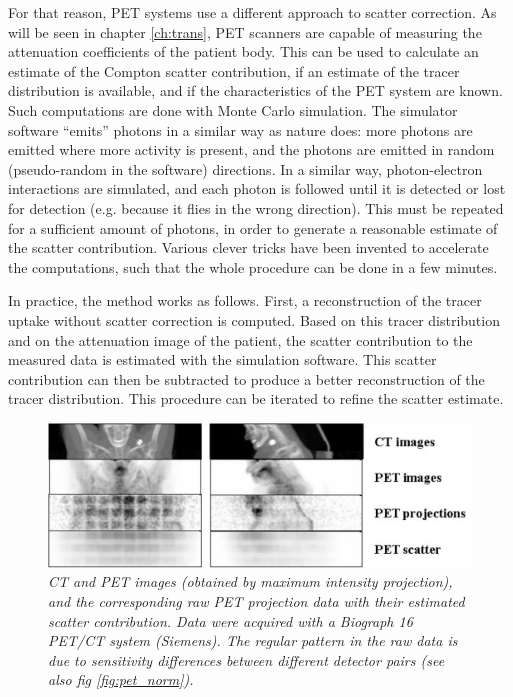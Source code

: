 For that reason, PET systems use a different approach to scatter
correction. As will be seen in chapter \ref{ch:trans}, PET scanners
are capable of measuring the attenuation coefficients of the patient
body. This can be used to calculate an estimate of the Compton scatter
contribution, if an estimate of the tracer distribution is available,
and if the characteristics of the PET system are known. Such
computations are done with Monte Carlo simulation. The simulator
software ``emits'' photons in a similar way as nature does: more
photons are emitted where more activity is present, and the photons
are emitted in random (pseudo-random in the software) directions. In a
similar way, photon-electron interactions are simulated, and each
photon is followed until it is detected or lost for detection
(e.g. because it flies in the wrong direction). This must be repeated
for a sufficient amount of photons, in order to generate a reasonable
estimate of the scatter contribution. Various clever tricks have been
invented to accelerate the computations, such that the whole procedure
can be done in a few minutes.

In practice, the method works as follows. First, a reconstruction of
the tracer uptake without scatter correction is computed. Based on
this tracer distribution and on the attenuation image of the patient,
the scatter contribution to the measured data is estimated with the
simulation software. This scatter contribution can then be subtracted
to produce a better reconstruction of the tracer distribution. This
procedure can be iterated to refine the scatter estimate.

\begin{figure}[tb]
\centering
\includegraphics[width=\figbig]{figs/fig_pet_scatter.pdf}
\caption{\label{fig:petscatter} \emph{CT and PET images (obtained by
    maximum intensity projection), and the corresponding raw PET
    projection data with their estimated scatter contribution. Data
    were acquired with a Biograph 16 PET/CT system (Siemens). The
    regular pattern in the raw data is due to sensitivity differences
    between different detector pairs (see also fig \ref{fig:pet_norm}).}}
\end{figure}

